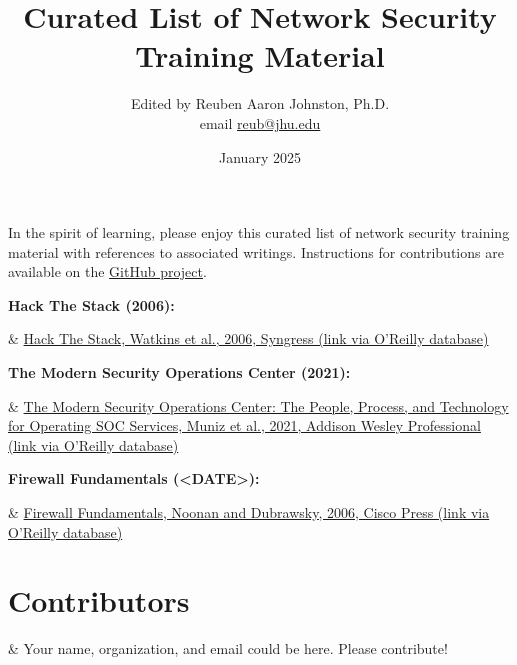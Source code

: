 \documentclass[a4paper]{article}
\title{Curated List of Network Security Training Material}
\author{Edited by Reuben Aaron Johnston, Ph.D. \\ email \href{mailto:reub@jhu.edu}{reub@jhu.edu}}
\date{January 2025}
\begin{document}
	\maketitle
	
	In the spirit of learning, please enjoy this curated list of network security training material with references to associated writings.  Instructions for contributions are available on the \href{https://github.com/reubenajohnston/CuratedCyberReads}{GitHub project}.
	
	\bigskip\noindent

	\noindent\textbf{Hack The Stack (2006):}
	\begin{easylist}[itemize]
	& \href{https://learning.oreilly.com/library/view/hack-the-stack/9781597491099}{Hack The Stack, Watkins et al., 2006, Syngress (link via O'Reilly database)}
  	\end{easylist}

	\noindent\textbf{The Modern Security Operations Center (2021):}
	\begin{easylist}[itemize]
	& \href{https://learning.oreilly.com/library/view/the-modern-security/9780135619858/}{The Modern Security Operations Center: The People, Process, and Technology for Operating SOC Services, Muniz et al., 2021, Addison Wesley Professional (link via O'Reilly database)}
  	\end{easylist}

	\noindent\textbf{Firewall Fundamentals (<DATE>):}
	\begin{easylist}[itemize]
	& \href{https://learning.oreilly.com/library/view/firewall-fundamentals/1587052210/}{Firewall Fundamentals, Noonan and Dubrawsky, 2006, Cisco Press (link via O'Reilly database)}
  	\end{easylist}

	\section*{Contributors}
 	\begin{easylist}[itemize]
  	& Your name, organization, and email could be here.  Please contribute!
	\end{easylist}
\end{document}
